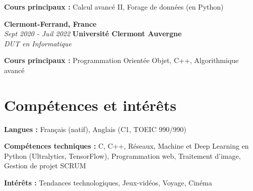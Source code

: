         \begin{onecolentry}
            \begin{highlights}
                \item \textbf{Cours principaux :} Calcul avancé II, Forage de données (en Python)
            \end{highlights}
        \end{onecolentry}

		\begin{twocolentry}{
			\textbf{Clermont-Ferrand, France} \\
			\textit{Sept 2020 - Juil 2022}
            }{
            \textbf{Université Clermont Auvergne} \\
            \textit{DUT en Informatique}
            }
        \end{twocolentry}

        \begin{onecolentry}
            \begin{highlights}
                \item \textbf{Cours principaux :} Programmation Orientée Objet, C++, Algorithmique avancé
            \end{highlights}
        \end{onecolentry}


    \section{Compétences et intérêts}
        \begin{onecolentry}
            \textbf{Langues :} Français (natif), Anglais (C1, TOEIC 990/990) 
        \end{onecolentry}

        \begin{onecolentry}
            \textbf{Compétences techniques :} C, C++, Réseaux, Machine et Deep Learning en Python (Ultralytics, TensorFlow), Programmation web, Traitement d'image, Gestion de projet SCRUM
        \end{onecolentry}

        \begin{onecolentry}
            \textbf{Intérêts :} Tendances technologiques, Jeux-vidéos, Voyage, Cinéma
        \end{onecolentry}